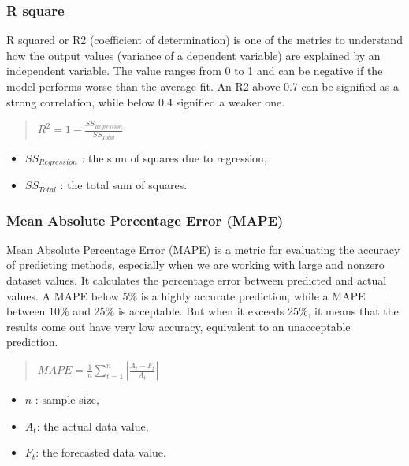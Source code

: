 \subsubsection{R square}
R squared or R2 (coefficient of determination) is one of the metrics to understand how the output values (variance of a dependent variable) are explained by an independent variable. The value ranges from 0 to 1 and can be negative if the model performs worse than the average fit. An R2 above 0.7 can be signified as a strong correlation, while below 0.4 signified a weaker one. 
\begin{quote}
    \(R^{2} = 1 - \frac{{SS}_{Regression}}{{SS}_{Total}}\)

\end{quote}
\begin{itemize}
    \item \({SS}_{Regression}\) : the sum of squares due to regression,
    \item \({SS}_{Total}\) : the total sum of squares.
\end{itemize}

\subsubsection{Mean Absolute Percentage Error (MAPE)}
Mean Absolute Percentage Error (MAPE) is a metric for evaluating the accuracy of predicting methods, especially when we are working with large and nonzero dataset values. It calculates the percentage error between predicted and actual values. A MAPE below 5\% is a highly accurate prediction, while a MAPE between 10\% and 25\% is acceptable. But when it exceeds 25\%, it means that the results come out have very low accuracy, equivalent to an unacceptable prediction. 

\begin{quote}
    
    \(MAPE = \frac{1}{n} \sum_{t=1}^{n}\left| \frac{A_{t} - F_{t}}{A_{t}} \right|\)
\end{quote}
\begin{itemize}
    \item  \(n\) : sample size,
    \item  \(A_{t}\): the actual data value,
    \item  \(F_{t}\): the forecasted data value.
\end{itemize}